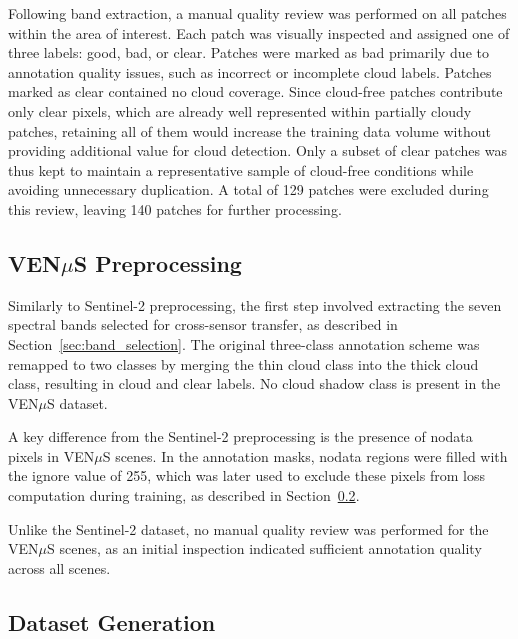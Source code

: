 Following band extraction, a manual quality review was performed on all patches within the area of interest. Each patch was visually inspected and assigned one of three labels: good, bad, or clear. Patches were marked as bad primarily due to annotation quality issues, such as incorrect or incomplete cloud labels. Patches marked as clear contained no cloud coverage. Since cloud-free patches contribute only clear pixels, which are already well represented within partially cloudy patches, retaining all of them would increase the training data volume without providing additional value for cloud detection. Only a subset of clear patches was thus kept to maintain a representative sample of cloud-free conditions while avoiding unnecessary duplication. A total of 129 patches were excluded during this review, leaving 140 patches for further processing.

\subsection{VEN$\mu$S Preprocessing}
\label{sec:venus_preprocessing}

Similarly to Sentinel-2 preprocessing, the first step involved extracting the seven spectral bands selected for cross-sensor transfer, as described in Section~\ref{sec:band_selection}. The original three-class annotation scheme was remapped to two classes by merging the thin cloud class into the thick cloud class, resulting in cloud and clear labels. No cloud shadow class is present in the VEN$\mu$S dataset.

A key difference from the Sentinel-2 preprocessing is the presence of nodata pixels in VEN$\mu$S scenes. In the annotation masks, nodata regions were filled with the ignore value of 255, which was later used to exclude these pixels from loss computation during training, as described in Section~\ref{sec:dataset_generation}.

Unlike the Sentinel-2 dataset, no manual quality review was performed for the VEN$\mu$S scenes, as an initial inspection indicated sufficient annotation quality across all scenes.

\subsection{Dataset Generation}
\label{sec:dataset_generation}

